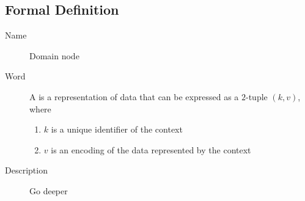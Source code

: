 
\subsection{Formal Definition}

\begin{description}
    \item[Name] Domain node \vspace{2mm}
    \item[Word] \begin{definition}[action]
              A \textbf{} is a representation of data that can be expressed as a $2$-tuple $(k,v)$, where
              \begin{enumerate}
                  \item $k$ is a unique identifier of the context
                  \item $v$ is an encoding of the data represented by the context
              \end{enumerate}
          \end{definition}
    \item[Description] Go deeper
\end{description}
